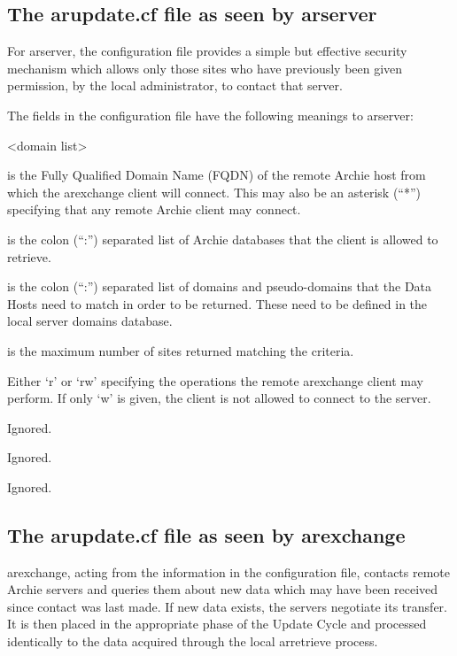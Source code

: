 \subsection{The arupdate.cf file as seen by arserver}

For arserver, the configuration file provides a simple but effective security
mechanism which allows only those sites who have previously been given
permission, by the local administrator, to contact that server.

The fields in the configuration file have the following meanings to arserver:

\begin{TTentry}{<domain list>}
\item[<client host>]
is the Fully Qualified Domain Name (FQDN) of the remote Archie host from which the arexchange client will connect. This may also be an asterisk (``*'') specifying that any remote Archie client may connect.

\item[<db list>]
is the colon (``:'') separated list of Archie databases that the client is allowed to retrieve.

\item[<domain list>]
is the colon (``:'') separated list of domains and pseudo-domains that the Data Hosts need to match in order to be returned. These need to be defined in the local server domains database.

\item[<max no>]
is the maximum number of sites returned matching the criteria.

\item[<perms>]
Either `r' or `rw' specifying the operations the remote arexchange client may
perform. If only `w' is given, the client is not allowed to connect to the server.

\item[<freq>]
Ignored.

\item[<date>]
Ignored.

\item[<fail>]
Ignored.
\end{TTentry}


\subsection{The arupdate.cf file as seen by arexchange}

arexchange, acting from the information in the configuration file, contacts remote Archie servers and queries them about new data which may have been received since contact was last made. If new data exists, the servers negotiate its transfer. It is then placed in the appropriate phase of the Update Cycle and processed identically to the data acquired through the local arretrieve process.

